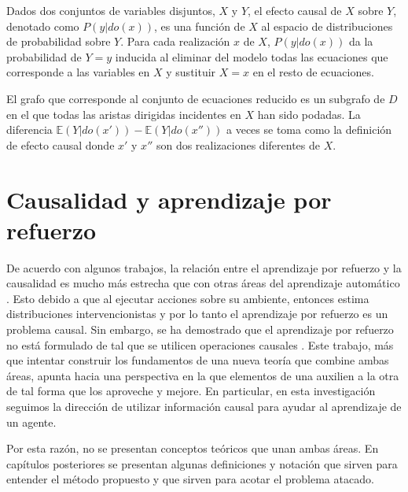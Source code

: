 Dados dos conjuntos de variables disjuntos, $X$ y $Y$,
el efecto causal de $X$ sobre $Y$, denotado como $P(y|do(x))$, es una
función de $X$ al espacio de distribuciones de probabilidad sobre $Y$. Para 
cada realización $x$ de $X$, $P(y| do(x))$ da la probabilidad de $Y=y$ 
inducida al eliminar del modelo todas las ecuaciones que corresponde a las
variables en $X$ y sustituir $X=x$ en el resto de ecuaciones.

El grafo que corresponde al conjunto de ecuaciones reducido es un
subgrafo de $D$ en el que todas las aristas dirigidas incidentes en $X$
han sido podadas. La diferencia $\mathbb{E}(Y|do(x'))- \mathbb{E}(Y|do(x''))$ a veces
se toma como la definición de efecto causal \cite{theoryofcausalities2006}
donde $x'$ y $x''$ son dos realizaciones diferentes de $X$.






\section{Causalidad y aprendizaje por refuerzo}

De acuerdo con algunos trabajos, la relación entre el aprendizaje por refuerzo
y la causalidad es mucho más estrecha que con otras áreas del
aprendizaje automático \cite{schlkopf2019causality} \cite{Gershman2017}. Esto debido a que al ejecutar acciones sobre su ambiente, entonces
estima distribuciones intervencionistas y por lo tanto el aprendizaje por refuerzo es un problema causal. Sin embargo, se ha demostrado que el aprendizaje
por refuerzo no está formulado de tal que se utilicen operaciones
causales \cite{gonzalezsoto2019reinforcement}.
Este trabajo, más que intentar construir los fundamentos de una nueva 
teoría que combine ambas áreas, apunta hacia una perspectiva
en la que elementos de una auxilien a la otra de tal forma que
los aproveche y mejore. En particular, en esta investigación
seguimos la dirección de utilizar información causal para ayudar al 
aprendizaje de un agente.

Por esta razón, no se presentan conceptos teóricos que unan ambas áreas. 
En capítulos posteriores se presentan algunas definiciones y notación
que sirven para entender el método propuesto y que sirven para acotar el
problema atacado.
